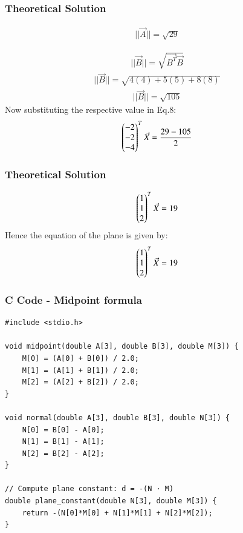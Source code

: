 \documentclass{beamer}
\begin{document}
\begin{frame}
\frametitle{Theoretical Solution}

\begin{align}
    ||\Vec{A}||=\sqrt{29}
\end{align}

\begin{align}
     ||\Vec{B}||=\sqrt{\Vec{B^T}\Vec{B}}
\end{align}
\begin{align}
     ||\Vec{B}||=\sqrt{4(4)+5(5)+8(8)}
\end{align}
\begin{align}
    ||\Vec{B}||=\sqrt{105}
\end{align}
Now substituting the respective value in Eq.8:
\begin{align}
     \begin{pmatrix}-2\\-2\\-4\end{pmatrix}^T\Vec{X}=\frac{29-105}{2}
\end{align}



\end{frame}
\begin{frame}
\frametitle{Theoretical Solution}


\begin{align}
    \begin{pmatrix}1\\1\\2\end{pmatrix}^T\Vec{X}=19
\end{align}
Hence the equation of the plane is given by:
\begin{align}
    \begin{pmatrix}1\\1\\2\end{pmatrix}^T\Vec{X}=19
\end{align}


\end{frame}





\begin{frame}[fragile]
    \frametitle{C Code - Midpoint formula }

    \begin{lstlisting}
#include <stdio.h>

void midpoint(double A[3], double B[3], double M[3]) {
    M[0] = (A[0] + B[0]) / 2.0;
    M[1] = (A[1] + B[1]) / 2.0;
    M[2] = (A[2] + B[2]) / 2.0;
}

void normal(double A[3], double B[3], double N[3]) {
    N[0] = B[0] - A[0];
    N[1] = B[1] - A[1];
    N[2] = B[2] - A[2];
}

// Compute plane constant: d = -(N · M)
double plane_constant(double N[3], double M[3]) {
    return -(N[0]*M[0] + N[1]*M[1] + N[2]*M[2]);
}


    \end{lstlisting}
\end{frame}
\end{document}
